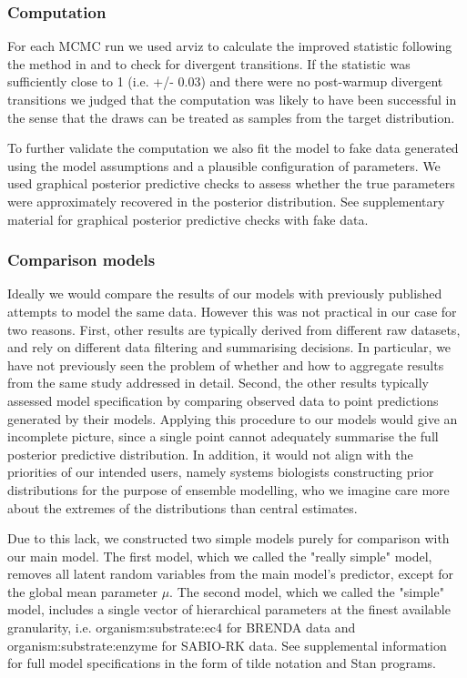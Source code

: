 \documentclass[11pt]{article}
\begin{document}
\subsubsection{Computation}
\label{sec:org13b81c3}
For each MCMC run we used arviz  to
calculate the improved  statistic following the method in  and to check for
divergent transitions. If the  statistic was sufficiently close to 1
(i.e. +/- 0.03) and there were no post-warmup divergent transitions we judged
that the computation was likely to have been successful in the sense that the
draws can be treated as samples from the target distribution.

To further validate the computation we also fit the model to fake data generated
using the model assumptions and a plausible configuration of parameters. We used
graphical posterior predictive checks to assess whether the true parameters were
approximately recovered in the posterior distribution. See supplementary
material for graphical posterior predictive checks with fake data.

\subsubsection{Comparison models}
\label{sec:org44dd353}
Ideally we would compare the results of our models with previously published
attempts to model the same data. However this was not practical in our case for
two reasons. First, other results are typically derived from different raw
datasets, and rely on different data filtering and summarising decisions. In
particular, we have not previously seen the problem of whether and how to
aggregate results from the same study addressed in detail. Second, the other
results typically assessed model specification by comparing observed data to
point predictions generated by their models. Applying this procedure to our
models would give an incomplete picture, since a single point cannot adequately
summarise the full posterior predictive distribution. In addition, it would not
align with the priorities of our intended users, namely systems biologists
constructing prior distributions for the purpose of ensemble modelling, who we
imagine care more about the extremes of the distributions than central
estimates.

Due to this lack, we constructed two simple models purely for comparison with
our main model. The first model, which we called the "really simple" model,
removes all latent random variables from the main model's predictor, except for
the global mean parameter \(\mu\). The second model, which we called the "simple"
model, includes a single vector of hierarchical parameters at the finest
available granularity, i.e. organism:substrate:ec4 for BRENDA data and
organism:substrate:enzyme for SABIO-RK data. See supplemental information for
full model specifications in the form of tilde notation and Stan programs.
\end{document}
